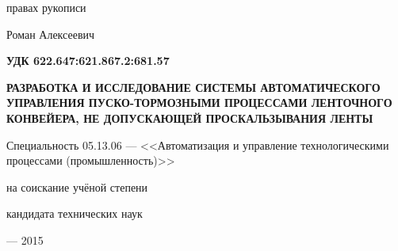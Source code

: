 \fontsize{14pt}{15pt}\selectfont  %
\thispagestyle{empty}

\vspace{10mm}
\begin{flushright}
   правах рукописи
\end{flushright}

\vspace{30mm}
\begin{center}
{\Large{} Роман Алексеевич}
\end{center}

\vspace{10mm}
\begin{flushright}
{\bf УДК 622.647:621.867.2:681.57}
\end{flushright}

\vspace{10mm}
\begin{center}
{\bf \LARGE РАЗРАБОТКА И ИССЛЕДОВАНИЕ СИСТЕМЫ АВТОМАТИЧЕСКОГО УПРАВЛЕНИЯ ПУСКО-ТОРМОЗНЫМИ ПРОЦЕССАМИ ЛЕНТОЧНОГО КОНВЕЙЕРА, НЕ ДОПУСКАЮЩЕЙ ПРОСКАЛЬЗЫВАНИЯ ЛЕНТЫ
\par}

\vspace{10mm}
{\Large
Специальность 05.13.06 --- <<Автоматизация и управление технологическими процессами (промышленность)>>
}

\vspace{15mm}
\par
{} на соискание учёной степени\par
кандидата технических наук
\end{center}

\vspace{30mm}
\begin{center}
{ --- 2015}
\end{center}

\newpage

